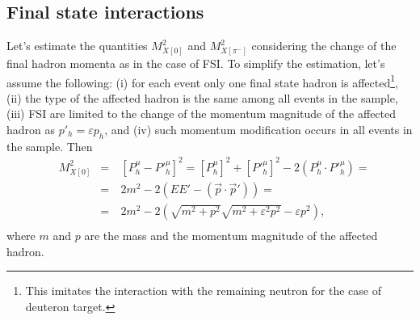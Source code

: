 \subsection*{Final state interactions}
\vspace{-0.5em}
Let's estimate the quantities $M_{X[0]}^{2}$ and $M_{X[\pi^{-}]}^{2}$ considering the change of the final hadron momenta as in the case of FSI. To simplify the estimation, let's assume the following: (i) for each event only one final state hadron is affected\footnote[5]{This imitates the interaction with the remaining neutron for the case of deuteron target.}, (ii) the type of the affected hadron is the same among all events in the sample, (iii) FSI are limited to the change of the momentum magnitude of the affected hadron as $p'_{h} = \varepsilon p_{h}$, and (iv) such momentum modification occurs in all events in the sample. Then\vspace{-0.5em}
\begin{equation}
\begin{aligned}
&M_{X[0]}^{2}&=&~[P^{\mu}_{h} -P'^{\mu}_{h}]^{2} = [P^{\mu}_{h}]^{2} +[P'^{\mu}_{h}]^{2}-2(P^{\mu}_{h}\cdot P'^{\mu}_{h} )=\\
&&=&~2m^{2}-2(EE' - (\overrightarrow{p}\cdot \overrightarrow{p}'))=\\
&&=&~2m^{2} - 2(\sqrt{m^{2}+p^{2}}\sqrt{m^{2}+\varepsilon^{2}p^{2}}-\varepsilon p^{2}),\\[-7pt]
\end{aligned}\label{eq:mm0_fsi}
\end{equation}
where $m$ and $p$ are the mass and the momentum magnitude of the affected hadron.


